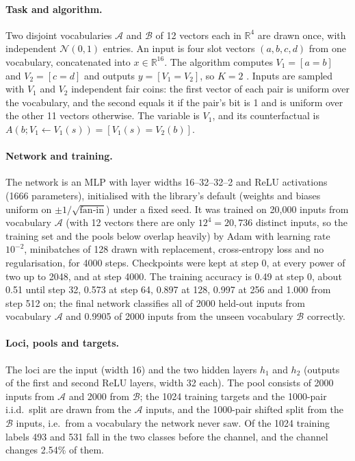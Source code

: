 \documentclass[11pt,a4paper]{article}
\begin{document}
\paragraph{Task and algorithm.} Two disjoint vocabularies $\mathcal A$ and $\mathcal B$ of 12 vectors each in $\mathbb R^4$ are drawn once, with independent $\mathcal N(0,1)$ entries. An input is four slot vectors $(a,b,c,d)$ from one vocabulary, concatenated into $x\in\mathbb R^{16}$. The algorithm computes $V_1=[a=b]$ and $V_2=[c=d]$ and outputs $y=[V_1=V_2]$, so $K=2$ \cite{geiger2023relational,geiger2024das}. Inputs are sampled with $V_1$ and $V_2$ independent fair coins: the first vector of each pair is uniform over the vocabulary, and the second equals it if the pair's bit is 1 and is uniform over the other 11 vectors otherwise. The variable is $V_1$, and its counterfactual is $A(b;V_1\leftarrow V_1(s))=[V_1(s)=V_2(b)]$.

\paragraph{Network and training.} The network is an MLP with layer widths 16--32--32--2 and ReLU activations (1666 parameters), initialised with the library's default (weights and biases uniform on $\pm1/\sqrt{\text{fan-in}}$) under a fixed seed. It was trained on 20{,}000 inputs from vocabulary $\mathcal A$ (with 12 vectors there are only $12^4=20{,}736$ distinct inputs, so the training set and the pools below overlap heavily) by Adam with learning rate $10^{-2}$, minibatches of 128 drawn with replacement, cross-entropy loss and no regularisation, for 4000 steps. Checkpoints were kept at step 0, at every power of two up to 2048, and at step 4000. The training accuracy is 0.49 at step 0, about 0.51 until step 32, 0.573 at step 64, 0.897 at 128, 0.997 at 256 and 1.000 from step 512 on; the final network classifies all of 2000 held-out inputs from vocabulary $\mathcal A$ and 0.9905 of 2000 inputs from the unseen vocabulary $\mathcal B$ correctly.

\paragraph{Loci, pools and targets.} The loci are the input (width 16) and the two hidden layers $h_1$ and $h_2$ (outputs of the first and second ReLU layers, width 32 each). The pool consists of 2000 inputs from $\mathcal A$ and 2000 from $\mathcal B$; the 1024 training targets and the 1000-pair i.i.d.\ split are drawn from the $\mathcal A$ inputs, and the 1000-pair shifted split from the $\mathcal B$ inputs, i.e.\ from a vocabulary the network never saw. Of the 1024 training labels 493 and 531 fall in the two classes before the channel, and the channel changes 2.54\% of them.
\end{document}
